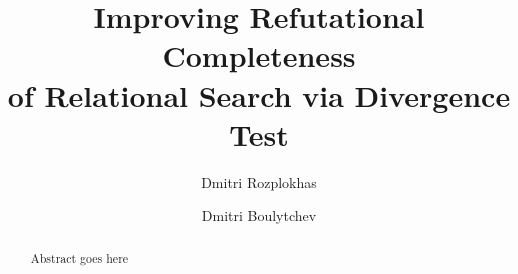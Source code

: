 \documentclass{llncs}
\begin{document}
\mainmatter

\title{Improving Refutational Completeness\\
of Relational Search via Divergence Test}

\author{
  Dmitri Rozplokhas \and Dmitri Boulytchev
}


\maketitle

\begin{abstract}
Abstract goes here
\end{abstract}






\end{document}

